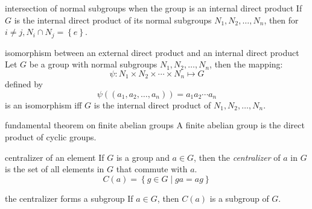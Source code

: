 \documentclass[avery5371,grid]{flashcards}
\begin{document}
\begin{flashcard}[Lemma]{intersection of normal subgroups when the group
is an internal direct product}
If $G$ is the internal direct product of its normal subgroups
$N_{1},N_{2},\ldots,N_{n}$, then for $i \neq j, N_{i} \cap N_{j} = 
\left\lbrace e \right\rbrace $.
\end{flashcard}

\begin{flashcard}[Theorem]{isomorphism between an external direct product
and an internal direct product}
Let $G$ be a group with normal subgroups $N_{1},N_{2},\ldots,N_{n}$, then the
mapping:
\begin{equation*}
\psi : N_{1} \times N_{2} \times \cdots \times N_{n} \mapsto G
\end{equation*}
defined by
\begin{equation*}
\psi((a_{1},a_{2},\ldots,a_{n})) = a_{1}a_{2}\cdots a_{n}
\end{equation*}
is an isomorphism iff $G$ is the internal direct product of 
$N_{1},N_{2},\ldots,N_{n}$.
\end{flashcard}

\begin{flashcard}[Theorem]{fundamental theorem on finite abelian groups}
A finite abelian group is the direct product of cyclic groups. 
\end{flashcard}

\begin{flashcard}[Definition]{centralizer of an element}
If $G$ is a group and $a \in G$, then the \textit{centralizer} of $a$ in $G$ is the
set of all elements in $G$ that commute with $a$.
\begin{equation*}
C(a) = \left\lbrace g \in G \mid ga = ag \right\rbrace 
\end{equation*}
\end{flashcard}

\begin{flashcard}[Lemma]{the centralizer forms a subgroup}
If $a \in G$, then $C(a)$ is a subgroup of $G$.
\end{flashcard}
\end{document}
